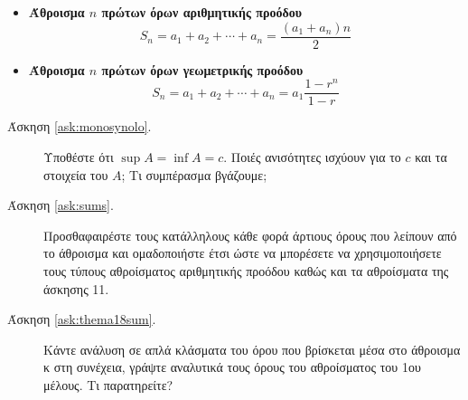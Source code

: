 \vspace{\baselineskip}


\begin{center}
\end{center}

\begin{itemize}
    \item {\bfseries Άθροισμα $n$ πρώτων όρων αριθμητικής προόδου}
        \[
            S_{n} = a_{1} + a_{2} + \cdots + a_{n} = \frac{(a_{1} + a_{n})n}{2} 
         \]
     \item {\bfseries Άθροισμα $n$ πρώτων όρων γεωμετρικής προόδου}
         \[
             S_{n} = a_{1} + a_{2} + \cdots + a_{n} = a_{1}\frac{1 - r^{n}}{1-r}  
          \] 
\end{itemize}

\begin{description}
    \item [Άσκηση \ref{ask:monosynolo}.] Υποθέστε ότι $ \sup A = \inf A = c
    $. Ποιές ανισότητες ισχύουν για το $c$ και τα στοιχεία του $A$; 
    Τι συμπέρασμα βγάζουμε;

    \item [Άσκηση \ref{ask:sums}.] Προσθαφαιρέστε τους κατάλληλους κάθε φορά  άρτιους όρους
        που λείπουν από το άθροισμα και ομαδοποιήστε έτσι ώστε να μπορέσετε να 
        χρησιμοποιήσετε τους τύπους αθροίσματος αριθμητικής προόδου καθώς και τα 
        αθροίσματα της άσκησης 11.

    \item [Άσκηση \ref{ask:thema18sum}.] Κάντε ανάλυση σε απλά κλάσματα 
        του όρου που βρίσκεται μέσα στο άθροισμα κ στη συνέχεια, γράψτε
        αναλυτικά τους όρους του αθροίσματος του 1ου μέλους. Τι παρατηρείτε?
\end{description}




